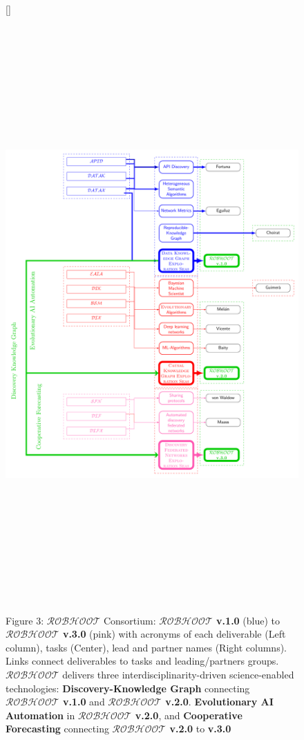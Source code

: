 \documentclass[11pt, a4paper]{article} %
\begin{document}
\begin{figure}[h!]
  [\FBwidth]
  {\caption*{Figure 3: $\mathcal{ROBHOOT}$ Consortium: {\bf
        $\mathcal{ROBHOOT}$ v.1.0} (blue) to {\bf $\mathcal{ROBHOOT}$
        v.3.0} (pink) with acronyms of each deliverable (Left column),
      tasks (Center), lead and partner names (Right columns). Links
      connect deliverables to tasks and leading/partners
      groups. $\mathcal{ROBHOOT}$ delivers three
      interdisciplinarity-driven science-enabled technologies: {\bf
        Discovery-Knowledge Graph} connecting {\bf $\mathcal{ROBHOOT}$
        v.1.0} and {\bf $\mathcal{ROBHOOT}$ v.2.0}. {\bf Evolutionary
        AI Automation} in {\bf $\mathcal{ROBHOOT}$ v.2.0}, and {\bf
        Cooperative Forecasting} connecting {\bf $\mathcal{ROBHOOT}$
        v.2.0} to {\bf v.3.0}}}
  {\includegraphics[width=12cm,height=22cm]{Figures/Consortium.pdf}}
\end{figure}
  
\end{document}
